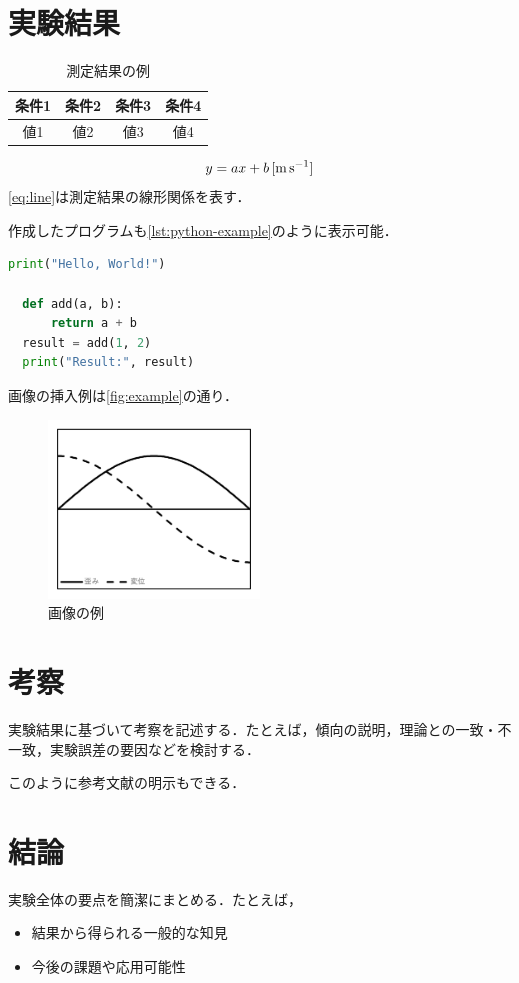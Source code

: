 \documentclass[lualatex,ja=standard]{bxjsarticle}
\begin{document}
\section{実験結果}

\begin{table}[htbp]
  \centering
  \caption{測定結果の例}
  \label{tab:example}
  \begin{tabular}{cccc}
    \toprule
    条件1 & 条件2 & 条件3 & 条件4 \\
    \midrule
    値1 & 値2 & 値3 & 値4 \\
    \bottomrule
  \end{tabular}
\end{table}

\begin{equation}
  y = a x + b \,\text{[\si{\meter\per\second}]}
  \label{eq:line}
\end{equation}
\autoref{eq:line}は測定結果の線形関係を表す．

作成したプログラムも\autoref{lst:python-example}のように表示可能．

\begin{lstlisting}[language=Python, caption=Pythonの例, label=lst:python-example]
  print("Hello, World!")

  def add(a, b):
      return a + b
  result = add(1, 2)
  print("Result:", result)
\end{lstlisting}

画像の挿入例は\autoref{fig:example}の通り．

\begin{figure}[htbp]
  \centering
  \includegraphics[width=0.5\textwidth]{img/CN/graph.png}
  \caption{画像の例}
  \label{fig:example}
\end{figure}

\section{考察}
実験結果に基づいて考察を記述する．たとえば，傾向の説明，理論との一致・不一致，実験誤差の要因などを検討する．

このように参考文献の明示もできる\cite{nist811-si-guide}．

\section{結論}
実験全体の要点を簡潔にまとめる．たとえば，
\begin{itemize}
  \item 結果から得られる一般的な知見
  \item 今後の課題や応用可能性
\end{itemize}

\printbibliography[title=＜参考文献＞]
\end{document}
